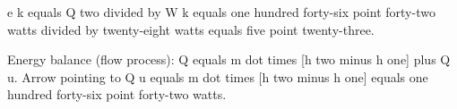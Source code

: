 e k equals Q two divided by W k equals one hundred forty-six point forty-two watts divided by twenty-eight watts equals five point twenty-three.  

Energy balance (flow process):  
Q equals m dot times [h two minus h one] plus Q u.  
Arrow pointing to Q u equals m dot times [h two minus h one] equals one hundred forty-six point forty-two watts.